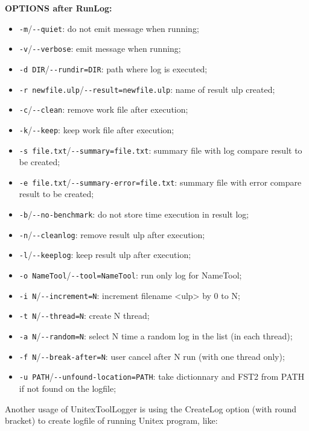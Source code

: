 \bigskip
\noindent \textbf{OPTIONS after RunLog:}
\begin{itemize}
  \item \verb+-m+/\verb+--quiet+: do not emit message when running;
  \item \verb+-v+/\verb+--verbose+: emit message when running;
  
  \item \verb+-d DIR+/\verb+--rundir=DIR+: path where log is executed;
  \item \verb+-r newfile.ulp+/\verb+--result=newfile.ulp+: name of result ulp created;

  \item \verb+-c+/\verb+--clean+: remove work file after execution;
  \item \verb+-k+/\verb+--keep+: keep work file after execution;

  \item \verb+-s file.txt+/\verb+--summary=file.txt+: summary file with log compare result to be created;
  \item \verb+-e file.txt+/\verb+--summary-error=file.txt+: summary file with error compare result to be created;

  \item \verb+-b+/\verb+--no-benchmark+: do not store time execution in result log;

  \item \verb+-n+/\verb+--cleanlog+: remove result ulp after execution;
  \item \verb+-l+/\verb+--keeplog+: keep result ulp after execution;

  \item \verb+-o NameTool+/\verb+--tool=NameTool+: run only log for NameTool;
  \item \verb+-i N+/\verb+--increment=N+: increment filename <ulp> by 0 to N;
  \item \verb+-t N+/\verb+--thread=N+: create N thread;
  \item \verb+-a N+/\verb+--random=N+: select N time a random log in the list (in each thread);
  \item \verb+-f N+/\verb+--break-after=N+: user cancel after N run (with one thread only);

  \item \verb+-u PATH+/\verb+--unfound-location=PATH+: take dictionnary and FST2 from PATH if not found on the logfile;
\end{itemize}


Another usage of UnitexToolLogger is using the CreateLog option (with round bracket) to create logfile of running Unitex program, like:


